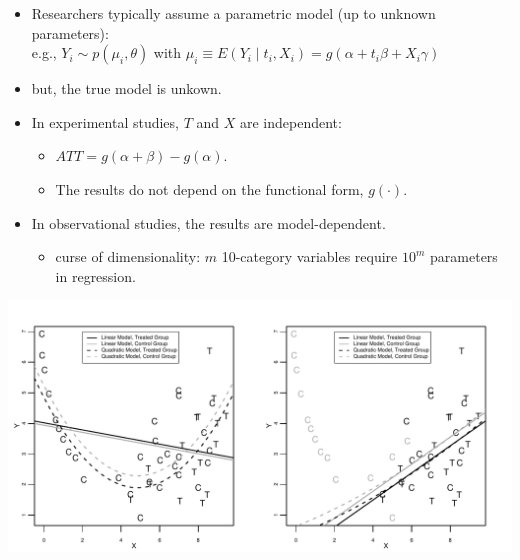 \documentclass[20pt,landscape,pdftex]{foils}
\begin{document}
\begin{itemize}
\zerolistvertdimens 
\item Researchers typically assume a parametric model (up to unknown
  parameters):\\ e.g., $Y_i \sim p(\mu_i, \theta)$ with $\mu_i \equiv
  E(Y_i \mid t_i, X_i)=g(\alpha+t_i \beta + X_i \gamma)$\pause
\item but, the true model is unkown.\pause
\item In experimental studies, $T$ and $X$ are independent:\pause 
  \begin{itemize}
  \item $ATT = g(\alpha+\beta) - g(\alpha).$\pause
  \item The results do not depend on the functional form,
    $g(\cdot)$.\pause 
  \end{itemize}
\item In observational studies, the results are model-dependent.\pause
  \begin{itemize}
  \item curse of dimensionality: $m$ 10-category variables require
    $10^m$ parameters in regression.\pause
  \end{itemize}
\end{itemize}

 \begin{center}
   \includegraphics{figs/olspanel-thick.pdf}
 \end{center}



\hypersetup{pdfpagetransition=Replace}
\end{document}
